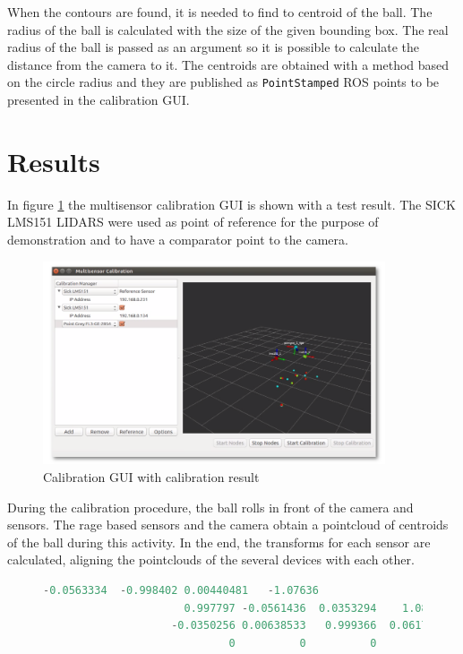 When the contours are found, it is needed to find to centroid of the ball. The radius of the ball is calculated with the size of the given bounding box. The real radius of the ball is passed as an argument so it is possible to calculate the distance from the camera to it. The centroids are obtained with a method based on the circle radius and they are published as \texttt{PointStamped} ROS points to be presented in the calibration GUI. 

\section{Results}

In figure \ref{fig:gui} the multisensor calibration GUI is shown with a test result. The SICK LMS151 LIDARS were used as point of reference for the purpose of demonstration and to have a comparator point to the camera.
\begin{figure}[htp]
	
	\centering
	\includegraphics[width=0.9\textwidth]{capcalib/imgs/gui.png}
	
	\caption{Calibration GUI with calibration result}
	\label{fig:gui}
	
\end{figure}

During the calibration procedure, the ball rolls in front of the camera and sensors. The rage based sensors and the camera obtain a pointcloud of centroids of the ball during this activity. In the end, the transforms for each sensor are calculated, aligning the pointclouds of the several devices with each other. 

\begin{figure}
	\begin{center}
		\begin{lstlisting}[label={lst:calib_result}, caption={Calibration output file.},language=c++]
					-0.0563334  -0.998402 0.00440481   -1.07636
					  0.997797 -0.0561436  0.0353294    1.08224
					-0.0350256 0.00638533   0.999366  0.0617893
					         0          0          0          1	\end{lstlisting}
	\end{center}
\end{figure}


